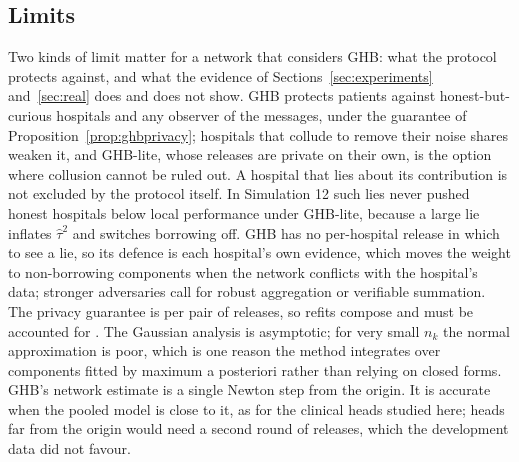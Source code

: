 \documentclass[acmsmall,screen,review]{acmart}
\theoremstyle{acmdefinition}
\begin{document}
\subsection{Limits}\label{sec:limits}

Two kinds of limit matter for a network that considers GHB: what the protocol protects against, and what the evidence of Sections~\ref{sec:experiments} and~\ref{sec:real} does and does not show. GHB protects patients against honest-but-curious hospitals and any observer of the messages, under the guarantee of Proposition~\ref{prop:ghbprivacy}; hospitals that collude to remove their noise shares weaken it, and GHB-lite, whose releases are private on their own, is the option where collusion cannot be ruled out. A hospital that lies about its contribution is not excluded by the protocol itself. In Simulation 12 such lies never pushed honest hospitals below local performance under GHB-lite, because a large lie inflates $\hat{\tau}^2$ and switches borrowing off. GHB has no per-hospital release in which to see a lie, so its defence is each hospital's own evidence, which moves the weight to non-borrowing components when the network conflicts with the hospital's data; stronger adversaries call for robust aggregation \cite{blanchard2017machine} or verifiable summation. The privacy guarantee is per pair of releases, so refits compose and must be accounted for \cite{bun2016concentrated,mironov2017renyi}. The Gaussian analysis is asymptotic; for very small $n_k$ the normal approximation is poor, which is one reason the method integrates over components fitted by maximum a posteriori rather than relying on closed forms. GHB's network estimate is a single Newton step from the origin. It is accurate when the pooled model is close to it, as for the clinical heads studied here; heads far from the origin would need a second round of releases, which the development data did not favour.
\end{document}
